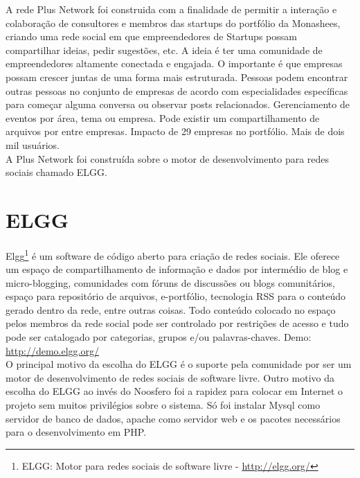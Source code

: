 \documentclass[12pt, letterpaper, onecolumn]{article}
\begin{document}
A rede Plus Network foi construida com a finalidade de permitir a interação e colaboração de consultores e membros das startups do portfólio da Monashees, criando uma rede social em que empreendedores de Startups possam compartilhar ideias, pedir sugestões, etc. A ideia é ter uma comunidade de empreendedores altamente conectada e engajada. O importante é que empresas possam crescer juntas de uma forma mais estruturada. Pessoas podem encontrar outras pessoas no conjunto de empresas de acordo com especialidades específicas para começar alguma conversa ou observar posts relacionados. Gerenciamento de eventos por área, tema ou empresa. Pode existir um compartilhamento de arquivos por entre empresas. Impacto de 29 empresas no portfólio. Mais de dois mil usuários.\\

A Plus Network foi construída sobre o motor de desenvolvimento para redes sociais chamado ELGG.



\section{ELGG}
Elgg\footnote{ELGG: Motor para redes sociais de software livre - \url{http://elgg.org/}} é um software de código aberto para criação de redes sociais. Ele oferece um espaço de compartilhamento de informação e dados por intermédio de blog e micro-blogging, comunidades com fóruns de discussões ou blogs comunitários, espaço para repositório de arquivos, e-portfólio, tecnologia RSS para o conteúdo gerado dentro da rede, entre outras coisas. Todo conteúdo colocado no espaço pelos membros da rede social pode ser controlado por restrições de acesso e tudo pode ser catalogado por categorias, grupos e/ou palavras-chaves. Demo: \url{http://demo.elgg.org/}\\

O principal motivo da escolha do ELGG é o suporte pela comunidade por ser um motor de desenvolvimento de redes sociais de software livre. Outro motivo da escolha do ELGG ao invés do Noosfero foi a rapidez para colocar em Internet o projeto sem muitos privilégios sobre o sistema. Só foi instalar Mysql como servidor de banco de dados, apache como servidor web e os pacotes necessários para o desenvolvimento em PHP.
\end{document}
